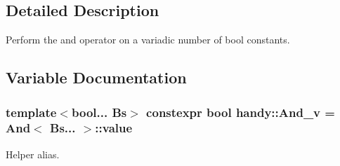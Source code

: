 \subsection{Detailed Description}
Perform the {\ttfamily and} operator on a variadic number of bool constants. 



\subsection{Variable Documentation}
\subsubsection[{\texorpdfstring{And\+\_\+v}{And_v}}]{\setlength{\rightskip}{0pt plus 5cm}template$<$bool... Bs$>$ constexpr bool handy\+::\+And\+\_\+v = And$<$ Bs... $>$\+::value}\hypertarget{group__AndGroup_ga0b8333d82725fa020f74b5eee7016dbc}{}\label{group__AndGroup_ga0b8333d82725fa020f74b5eee7016dbc}


Helper alias. 

